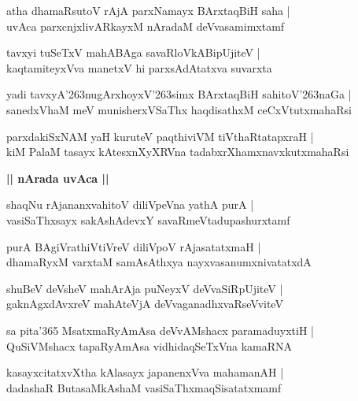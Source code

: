 \documentclass[twoside,12pt,openright]{book}
\def\S{\char'263}
\newcounter{shloka}[chapter]
\def\uvaca#1{\centerline{{\large\textbf{#1}}}}
\begin{document}
\begin{shloka}
atha dhamaRsutoV rAjA parxNamayx BArxtaqBiH saha |\\
uvAca parxcnjxlivARkayxM nAradaM deVvasamimxtamf
\end{shloka}

\begin{shloka}
tavxyi tuSeTxV mahABAga savaRloVkABipUjiteV |\\
kaqtamiteyxVva manetxV hi parxsAdAtatxva suvarxta
\end{shloka}

\begin{shloka}
yadi tavxyA\S nugArxhoyxV\S simx BArxtaqBiH sahitoV\S naGa |\\
sanedxVhaM meV munisherxVSaThx haqdisathxM ceCxVtutxmahaRsi
\end{shloka}

\begin{shloka}
parxdakiSxNAM yaH kuruteV paqthiviVM tiVthaRtatapxraH |\\
kiM PalaM tasayx kAtesxnXyXRVna tadabxrXhamxnavxkutxmahaRsi
\end{shloka}

\uvaca{|| nArada uvAca ||}

\begin{shloka}
shaqNu rAjananxvahitoV diliVpeVna yathA purA |\\
vasiSaThxsayx sakAshAdevxY savaRmeVtadupashurxtamf 
\end{shloka}

\begin{shloka}
purA BAgiVrathiVtiVreV diliVpoV rAjasatatxmaH |\\
dhamaRyxM varxtaM samAsAthxya nayxvasanumxnivatatxdA
\end{shloka}

\begin{shloka}
shuBeV deVsheV mahArAja puNeyxV deVvaSiRpUjiteV |\\
gaknAgxdAvxreV mahAteVjA deVvaganadhxvaRseVviteV
\end{shloka}

\begin{shloka}
sa pita\char'365  MsatxmaRyAmAsa deVvAMshacx paramaduyxtiH |\\
QuSiVMshacx tapaRyAmAsa vidhidaqSeTxVna kamaRNA
\end{shloka}

\begin{shloka}
kasayxcitatxvXtha kAlasayx japanenxVva  mahamanAH |\\
dadashaR ButasaMkAshaM vasiSaThxmaqSisatatxmamf
\end{shloka}
\end{document}
